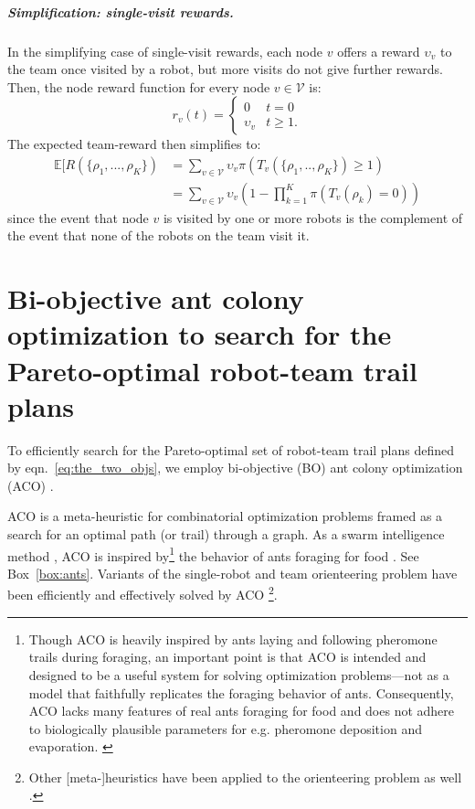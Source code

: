 \documentclass[11pt, oneside]{article}
\begin{document}
\vspace{-\baselineskip}
\subparagraph{Simplification: single-visit rewards.}
In the simplifying case of single-visit rewards, each node $v$ offers a reward $\upsilon_v$ to the team once visited by a robot, but more visits do not give further rewards. Then, the node reward function for every node $v\in\mathcal{V}$ is:
\begin{equation}
	r_v(t) = \begin{cases}
		0 & t = 0 \\
		\upsilon_v & t \geq 1.
	\end{cases}
\end{equation}The expected team-reward then simplifies to:
\begin{align}
	\mathbb{E}[R(\{\rho_1, ..., \rho_K\}) & = \sum_{v \in \mathcal{V} } \upsilon_v \pi(T_v(\{\rho_1, .., \rho_K\}) \geq 1) \\
		      & = \sum_{v \in \mathcal{V} } \upsilon_v \left(1 - \prod_{k=1}^K  \pi(T_v(\rho_k) =0) \right) 
\end{align} since the event that node $v$ is visited by one or more robots is the complement of the event that none of the robots on the team visit it.



\section{Bi-objective ant colony optimization to search for the Pareto-optimal robot-team trail plans}
To efficiently search for the Pareto-optimal set of robot-team trail plans defined by eqn.~\ref{eq:the_two_objs}, we employ bi-objective (BO) ant colony optimization (ACO) \cite{iredi2001bi}. 

ACO \cite{dorigo2006ant,bonabeau1999swarm,blum2005ant} is a meta-heuristic for combinatorial optimization problems framed as a search for an optimal path (or trail) through a graph.
As a swarm intelligence method \cite{bonabeau1999swarm}, ACO is inspired by\footnote{
Though ACO is heavily inspired by ants laying and following pheromone trails during foraging, an important point is that ACO is intended and designed to be a useful system for solving optimization problems---not as a model that faithfully replicates the foraging behavior of ants. 
Consequently, ACO lacks many features of real ants foraging for food and does not adhere to biologically plausible parameters for e.g. pheromone deposition and evaporation. \cite{bonabeau1999swarm}
}
 the behavior of ants foraging for food \cite{bonabeau2000inspiration}. See Box~\ref{box:ants}. 
Variants of the single-robot and team orienteering problem have been efficiently and effectively solved by ACO \cite{ke2008ants,chen2015multiobjective,verbeeck2017time,sohrabi2021acs,chen2022environment}\footnote{Other [meta-]heuristics have been applied to the orienteering problem as well \cite{gavalas2014survey,dang2013effective,chao1996fast,butt1994heuristic}.}.
\end{document}

